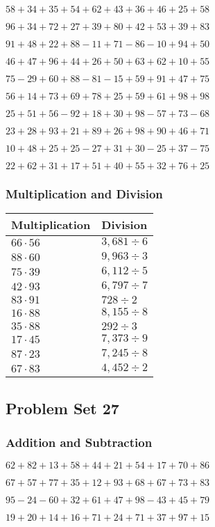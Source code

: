 \(58+34+35+54+62+43+36+46+25+ 58\)

\(96+34+72+27+39+80+42+53+39+83\)

\(91+48+22+88-11+71-86-10+94+50\)

\(46+47+96+44+26+50+63+62+10+55\)

\(75-29+60+88-81-15+59+91+47+75\)

\(56+14+73+69+78+25+59+61+98+98\)

\(25+51+56-92+18+30+98-57+73-68\)

\(23+28+93+21+89+26+98+90+46+71\)

\(10+48+25+25-27+31+30-25+37-75\)

\(22+62+31+17+51+40+55+32+76+25\)

\hypertarget{multiplication-and-division-66}{%
\subsubsection{Multiplication and
Division}\label{multiplication-and-division-66}}

\begin{longtable}[]{@{}ll@{}}
\toprule
Multiplication & Division\tabularnewline
\midrule
\endhead
\(66\cdot56\) & \(3,681÷6\)\tabularnewline
\(88\cdot60\) & \(9,963÷3\)\tabularnewline
\(75\cdot39\) & \(6,112÷5\)\tabularnewline
\(42\cdot93\) & \(6,797÷7\)\tabularnewline
\(83\cdot91\) & \(728÷2\)\tabularnewline
\(16\cdot88\) & \(8,155÷8\)\tabularnewline
\(35\cdot88\) & \(292÷3\)\tabularnewline
\(17\cdot45\) & \(7,373÷9\)\tabularnewline
\(87\cdot23\) & \(7,245÷8\)\tabularnewline
\(67\cdot83\) & \(4,452÷2\)\tabularnewline
\bottomrule
\end{longtable}

\hypertarget{problem-set-27-1}{%
\subsection{Problem Set 27}\label{problem-set-27-1}}

\hypertarget{addition-and-subtraction-67}{%
\subsubsection{Addition and
Subtraction}\label{addition-and-subtraction-67}}

\(62+82+13+58+44+21+54+17+70+ 86\)

\(67+57+77+35+12+93+68+67+73+83\)

\(95-24-60+32+61+47+98-43+45+79\)

\(19+20+14+16+71+24+71+37+97+15\)

